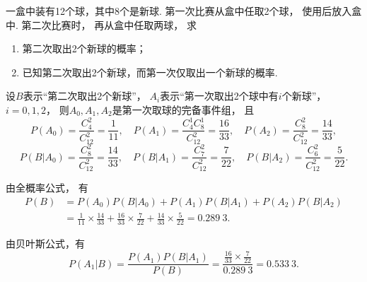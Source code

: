 \begin{example}
一盒中装有12个球，其中8个是新球.
第一次比赛从盒中任取2个球，
使用后放入盒中.
第二次比赛时，
再从盒中任取两球，
求\begin{enumerate}
	\item 第二次取出2个新球的概率；
	\item 已知第二次取出2个新球，而第一次仅取出一个新球的概率.
\end{enumerate}
\begin{solution}
设\(B\)表示“第二次取出2个新球”，
\(A_i\)表示“第一次取出2个球中有\(i\)个新球”，
\(i=0,1,2\)，
则\(A_0,A_1,A_2\)是第一次取球的完备事件组，
且\[
	P(A_0) = \frac{C_4^2}{C_{12}^2} = \frac{1}{11},
	\quad
	P(A_1) = \frac{C_4^1 C_8^1}{C_{12}^2} = \frac{16}{33},
	\quad
	P(A_2) = \frac{C_8^2}{C_{12}^2} = \frac{14}{33},
	\]\[
	P(B \vert A_0) = \frac{C_8^2}{C_{12}^2} = \frac{14}{33},
	\quad
	P(B \vert A_1) = \frac{C_7^2}{C_{12}^2} = \frac{7}{22},
	\quad
	P(B \vert A_2) = \frac{C_6^2}{C_{12}^2} = \frac{5}{22}.
\]

由全概率公式，
有\begin{align*}
	P(B) &= P(A_0) P(B \vert A_0)
		+ P(A_1) P(B \vert A_1)
		+ P(A_2) P(B \vert A_2) \\
	&= \frac{1}{11} \times \frac{14}{33}
		+ \frac{16}{33} \times \frac{7}{22}
		+ \frac{14}{33} \times \frac{5}{22}
	= 0.289~3.
\end{align*}

由贝叶斯公式，有\[
	P(A_1 \vert B) = \frac{P(A_1) P(B \vert A_1)}{P(B)}
	= \frac{\frac{16}{33} \times \frac{7}{22}}{0.289~3}
	= 0.533~3.
\]
\end{solution}
\end{example}
